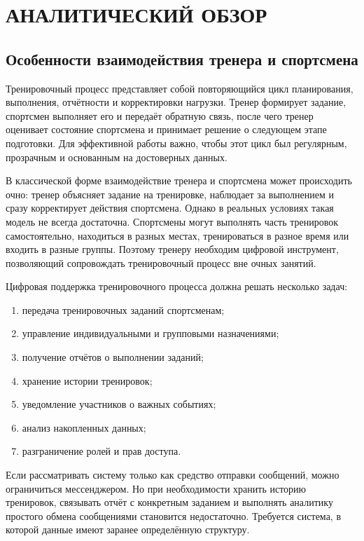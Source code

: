 \section{АНАЛИТИЧЕСКИЙ ОБЗОР}

\subsection{Особенности взаимодействия тренера и спортсмена}

Тренировочный процесс представляет собой повторяющийся цикл планирования, выполнения, отчётности и корректировки нагрузки. Тренер формирует задание, спортсмен выполняет его и передаёт обратную связь, после чего тренер оценивает состояние спортсмена и принимает решение о следующем этапе подготовки. Для эффективной работы важно, чтобы этот цикл был регулярным, прозрачным и основанным на достоверных данных.

В классической форме взаимодействие тренера и спортсмена может происходить очно: тренер объясняет задание на тренировке, наблюдает за выполнением и сразу корректирует действия спортсмена. Однако в реальных условиях такая модель не всегда достаточна. Спортсмены могут выполнять часть тренировок самостоятельно, находиться в разных местах, тренироваться в разное время или входить в разные группы. Поэтому тренеру необходим цифровой инструмент, позволяющий сопровождать тренировочный процесс вне очных занятий.

Цифровая поддержка тренировочного процесса должна решать несколько задач:

\begin{enumerate}
\def\labelenumi{\arabic{enumi}.}
\tightlist
\item
  передача тренировочных заданий спортсменам;
\item
  управление индивидуальными и групповыми назначениями;
\item
  получение отчётов о выполнении заданий;
\item
  хранение истории тренировок;
\item
  уведомление участников о важных событиях;
\item
  анализ накопленных данных;
\item
  разграничение ролей и прав доступа.
\end{enumerate}

Если рассматривать систему только как средство отправки сообщений, можно ограничиться мессенджером. Но при необходимости хранить историю тренировок, связывать отчёт с конкретным заданием и выполнять аналитику простого обмена сообщениями становится недостаточно. Требуется система, в которой данные имеют заранее определённую структуру.

